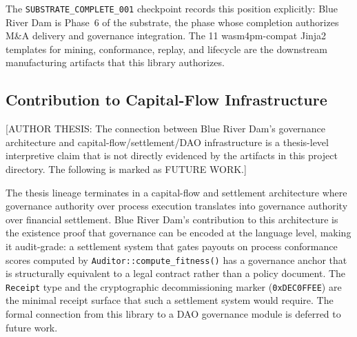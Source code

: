 The \texttt{SUBSTRATE\_COMPLETE\_001} checkpoint records this position
explicitly: Blue River Dam is Phase~6 of the substrate, the phase whose
completion authorizes M&A delivery and governance integration. The 11
wasm4pm-compat Jinja2 templates for mining, conformance, replay, and lifecycle
are the downstream manufacturing artifacts that this library authorizes.

\subsection{Contribution to Capital-Flow Infrastructure}
\label{sec:blue-river-dam-contribution-capital}

[AUTHOR THESIS: The connection between Blue River Dam's governance architecture
and capital-flow/settlement/DAO infrastructure is a thesis-level interpretive
claim that is not directly evidenced by the artifacts in this project directory.
The following is marked as FUTURE WORK.]

The thesis lineage terminates in a capital-flow and settlement architecture
where governance authority over process execution translates into governance
authority over financial settlement. Blue River Dam's contribution to this
architecture is the existence proof that governance can be encoded at the
language level, making it audit-grade: a settlement system that gates payouts
on process conformance scores computed by \texttt{Auditor::compute\_fitness()}
has a governance anchor that is structurally equivalent to a legal contract
rather than a policy document. The \texttt{Receipt} type and the
cryptographic decommissioning marker (\texttt{0xDEC0FFEE}) are the minimal
receipt surface that such a settlement system would require. The formal
connection from this library to a DAO governance module is deferred to
future work.
